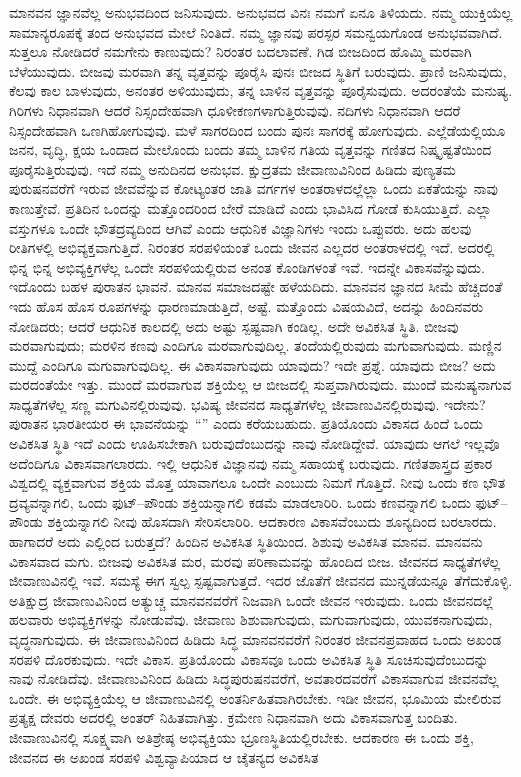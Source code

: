 ಮಾನವನ ಜ್ಞಾನವೆಲ್ಲ ಅನುಭವದಿಂದ ಜನಿಸುವುದು. ಅನುಭವದ ವಿನಃ ನಮಗೆ ಏನೂ ತಿಳಿಯದು. ನಮ್ಮ ಯುಕ್ತಿಯೆಲ್ಲ ಸಾಮಾನ್ಯರೂಪಕ್ಕೆ ತಂದ ಅನುಭವದ ಮೇಲೆ ನಿಂತಿದೆ. ನಮ್ಮ ಜ್ಞಾನವು ಪರಸ್ಪರ ಸಮನ್ವಯಗೊಂಡ ಅನುಭವವಾಗಿದೆ. ಸುತ್ತಲೂ ನೋಡಿದರೆ ನಮಗೇನು ಕಾಣುವುದು? ನಿರಂತರ ಬದಲಾವಣೆ. ಗಿಡ ಬೀಜದಿಂದ ಹೊಮ್ಮಿ ಮರವಾಗಿ ಬೆಳೆಯುವುದು. ಬೀಜವು ಮರವಾಗಿ ತನ್ನ ವೃತ್ತವನ್ನು ಪೂರೈಸಿ ಪುನಃ ಬೀಜದ ಸ್ಥಿತಿಗೆ ಬರುವುದು. ಪ್ರಾಣಿ ಜನಿಸುವುದು, ಕೆಲವು ಕಾಲ ಬಾಳುವುದು, ಅನಂತರ ಅಳಿಯುವುದು, ತನ್ನ ಬಾಳಿನ ವೃತ್ತವನ್ನು ಪೂರೈಸುವುದು. ಅದರಂತೆಯೆ ಮನುಷ್ಯ. ಗಿರಿಗಳು ನಿಧಾನವಾಗಿ ಆದರೆ ನಿಸ್ಸಂದೇಹವಾಗಿ ಧೂಳೀಕಣಗಳಾಗುತ್ತಿರುವುವು. ನದಿಗಳು ನಿಧಾನವಾಗಿ ಆದರೆ ನಿಸ್ಸಂದೇಹವಾಗಿ ಒಣಗಿಹೋಗುವುವು. ಮಳೆ ಸಾಗರದಿಂದ ಬಂದು ಪುನಃ ಸಾಗರಕ್ಕೆ ಹೋಗುವುದು. ಎಲ್ಲೆಡೆಯಲ್ಲಿಯೂ ಜನನ, ವೃದ್ಧಿ, ಕ್ಷಯ ಒಂದಾದ ಮೇಲೊಂದು ಬಂದು ತಮ್ಮ ಬಾಳಿನ ಗತಿಯ ವೃತ್ತವನ್ನು ಗಣಿತದ ನಿಷ್ಕೃಷ್ಟತೆಯಿಂದ ಪೂರೈಸುತ್ತಿರುವುವು. ಇದೆ ನಮ್ಮ ಅನುದಿನದ ಅನುಭವ. ಕ್ಷುದ್ರತಮ ಜೀವಾಣುವಿನಿಂದ ಹಿಡಿದು ಪುಣ್ಯತಮ ಪುರುಷನವರೆಗೆ ಇರುವ ಜೀವವೆನ್ನುವ ಕೋಟ್ಯಂತರ ಜಾತಿ ವರ್ಗಗಳ ಅಂತರಾಳದಲ್ಲೆಲ್ಲಾ ಒಂದು ಏಕತೆಯನ್ನು ನಾವು ಕಾಣುತ್ತೇವೆ. ಪ್ರತಿದಿನ ಒಂದನ್ನು ಮತ್ತೊಂದರಿಂದ ಬೇರೆ ಮಾಡಿದೆ ಎಂದು ಭಾವಿಸಿದ ಗೋಡೆ ಕುಸಿಯುತ್ತಿದೆ. ಎಲ್ಲಾ ವಸ್ತುಗಳೂ ಒಂದೇ ಭೌತದ್ರವ್ಯದಿಂದ ಆಗಿವೆ ಎಂದು ಆಧುನಿಕ ವಿಜ್ಞಾನಿಗಳು ಇಂದು ಒಪ್ಪುವರು. ಅದು ಹಲವು ರೀತಿಗಳಲ್ಲಿ ಅಭಿವ್ಯಕ್ತವಾಗುತ್ತಿದೆ. ನಿರಂತರ ಸರಪಳಿಯಂತೆ ಒಂದು ಜೀವನ ಎಲ್ಲದರ ಅಂತರಾಳದಲ್ಲಿ ಇದೆ. ಅದರಲ್ಲಿ ಭಿನ್ನ ಭಿನ್ನ ಅಭಿವ್ಯಕ್ತಿಗಳೆಲ್ಲ ಒಂದೇ ಸರಪಳಿಯಲ್ಲಿರುವ ಅನಂತ ಕೊಂಡಿಗಳಂತೆ ಇವೆ. ಇದನ್ನೇ ವಿಕಾಸವೆನ್ನುವುದು. ಇದೊಂದು ಬಹಳ ಪುರಾತನ ಭಾವನೆ. ಮಾನವ ಸಮಾಜದಷ್ಟೇ ಹಳೆಯದಿದು. ಮಾನವನ ಜ್ಞಾನದ ಸೀಮೆ ಹೆಚ್ಚಿದಂತೆ ಇದು ಹೊಸ ಹೊಸ ರೂಪಗಳನ್ನು ಧಾರಣಮಾಡುತ್ತಿದೆ, ಅಷ್ಟೆ. ಮತ್ತೊಂದು ವಿಷಯವಿದೆ, ಅದನ್ನು ಹಿಂದಿನವರು ನೋಡಿದರು; ಆದರೆ ಆಧುನಿಕ ಕಾಲದಲ್ಲಿ ಅದು ಅಷ್ಟು ಸ್ಪಷ್ಟವಾಗಿ ಕಂಡಿಲ್ಲ. ಅದೇ ಅವಿಕಸಿತ ಸ್ಥಿತಿ. ಬೀಜವು ಮರವಾಗುವುದು; ಮರಳಿನ ಕಣವು ಎಂದಿಗೂ ಮರವಾಗುವುದಿಲ್ಲ. ತಂದೆಯಲ್ಲಿರುವುದು ಮಗುವಾಗುವುದು. ಮಣ್ಣಿನ ಮುದ್ದೆ ಎಂದಿಗೂ ಮಗುವಾಗುವುದಿಲ್ಲ. ಈ ವಿಕಾಸವಾಗುವುದು ಯಾವುದು? ಇದೇ ಪ್ರಶ್ನೆ. ಯಾವುದು ಬೀಜ? ಅದು ಮರದಂತೆಯೇ ಇತ್ತು. ಮುಂದೆ ಮರವಾಗುವ ಶಕ್ತಿಯೆಲ್ಲ ಆ ಬೀಜದಲ್ಲಿ ಸುಪ್ತವಾಗಿರುವುದು. ಮುಂದೆ ಮನುಷ್ಯನಾಗುವ ಸಾಧ್ಯತೆಗಳೆಲ್ಲ ಸಣ್ಣ ಮಗುವಿನಲ್ಲಿರುವುವು. ಭವಿಷ್ಯ ಜೀವನದ ಸಾಧ್ಯತೆಗಳೆಲ್ಲ ಜೀವಾಣುವಿನಲ್ಲಿರುವುವು. ಇದೇನು? ಪುರಾತನ ಭಾರತೀಯರ ಈ ಭಾವನೆಯನ್ನು “” ಎಂದು ಕರೆಯಬಹುದು. ಪ್ರತಿಯೊಂದು ವಿಕಾಸದ ಹಿಂದೆ ಒಂದು ಅವಿಕಸಿತ ಸ್ಥಿತಿ ಇದೆ ಎಂದು ಊಹಿಸಬೇಕಾಗಿ ಬರುವುದೆಂಬುದನ್ನು ನಾವು ನೋಡಿದ್ದೇವೆ. ಯಾವುದು ಆಗಲೆ ಇಲ್ಲವೊ ಅದೆಂದಿಗೂ ವಿಕಾಸವಾಗಲಾರದು. ಇಲ್ಲಿ ಆಧುನಿಕ ವಿಜ್ಞಾನವು ನಮ್ಮ ಸಹಾಯಕ್ಕೆ ಬರುವುದು. ಗಣಿತಶಾಸ್ತ್ರದ ಪ್ರಕಾರ ವಿಶ್ವದಲ್ಲಿ ವ್ಯಕ್ತವಾಗುವ ಶಕ್ತಿಯ ಮೊತ್ತ ಯಾವಾಗಲೂ ಒಂದೇ ಎಂಬುದು ನಿಮಗೆ ಗೊತ್ತಿದೆ. ನೀವು ಒಂದು ಕಣ ಭೌತ ದ್ರವ್ಯವನ್ನಾಗಲಿ, ಒಂದು ಫುಟ್​–ಪೌಂಡು ಶಕ್ತಿಯನ್ನಾಗಲಿ ಕಡಮೆ ಮಾಡಲಾರಿರಿ. ಒಂದು ಕಣವನ್ನಾಗಲಿ ಒಂದು ಫುಟ್​–ಪೌಂಡು ಶಕ್ತಿಯನ್ನಾಗಲಿ ನೀವು ಹೊಸದಾಗಿ ಸೇರಿಸಲಾರಿರಿ. ಆದಕಾರಣ ವಿಕಾಸವೆಂಬುದು ಶೂನ್ಯದಿಂದ ಬರಲಾರದು. ಹಾಗಾದರೆ ಅದು ಎಲ್ಲಿಂದ ಬರುತ್ತದೆ? ಹಿಂದಿನ ಅವಿಕಸಿತ ಸ್ಥಿತಿಯಿಂದ. ಶಿಶುವು ಅವಿಕಸಿತ ಮಾನವ. ಮಾನವನು ವಿಕಾಸವಾದ ಮಗು. ಬೀಜವು ಅವಿಕಸಿತ ಮರ, ಮರವು ಪರಿಣಾಮವನ್ನು ಹೊಂದಿದ ಬೀಜ. ಜೀವನದ ಸಾಧ್ಯತೆಗಳೆಲ್ಲ ಜೀವಾಣುವಿನಲ್ಲಿ ಇವೆ. ಸಮಸ್ಯೆ ಈಗ ಸ್ವಲ್ಪ ಸ್ಪಷ್ಟವಾಗುತ್ತದೆ. ಇದರ ಜೊತೆಗೆ ಜೀವನದ ಮುನ್ನಡೆಯನ್ನೂ ತೆಗೆದುಕೊಳ್ಳಿ. ಅತಿಕ್ಷುದ್ರ ಜೀವಾಣುವಿನಿಂದ ಅತ್ಯುಚ್ಚ ಮಾನವನವರೆಗೆ ನಿಜವಾಗಿ ಒಂದೇ ಜೀವನ ಇರುವುದು. ಒಂದು ಜೀವನದಲ್ಲೆ ಹಲವಾರು ಅಭಿವ್ಯಕ್ತಿಗಳನ್ನು ನೋಡುವೆವು. ಜೀವಾಣು ಶಿಶುವಾಗುವುದು, ಮಗುವಾಗುವುದು, ಯುವಕನಾಗುವುದು, ವೃದ್ಧನಾಗುವುದು. ಈ ಜೀವಾಣುವಿನಿಂದ ಹಿಡಿದು ಸಿದ್ಧ ಮಾನವನವರೆಗೆ ನಿರಂತರ ಜೀವನಪ್ರವಾಹದ ಒಂದು ಅಖಂಡ ಸರಪಳಿ ದೊರಕುವುದು. ಇದೇ ವಿಕಾಸ. ಪ್ರತಿಯೊಂದು ವಿಕಾಸವೂ ಒಂದು ಅವಿಕಸಿತ ಸ್ಥಿತಿ ಸೂಚಿಸುವುದೆಂಬುದನ್ನು ನಾವು ನೋಡಿದೆವು. ಜೀವಾಣುವಿನಿಂದ ಹಿಡಿದು ಸಿದ್ಧಪುರುಷನವರೆಗೆ, ಅವತಾರದವರೆಗೆ ವಿಕಾಸವಾಗುವ ಜೀವನವೆಲ್ಲ ಒಂದೇ. ಈ ಅಭಿವ್ಯಕ್ತಿಯೆಲ್ಲ ಆ ಜೀವಾಣುವಿನಲ್ಲಿ ಅಂತರ್ನಿಹಿತವಾಗಿರಬೇಕು. ಇಡೀ ಜೀವನ, ಭೂಮಿಯ ಮೇಲಿರುವ ಪ್ರತ್ಯಕ್ಷ ದೇವರು ಅದರಲ್ಲಿ ಅಂತರ್ ನಿಹಿತವಾಗಿತ್ತು. ಕ್ರಮೇಣ ನಿಧಾನವಾಗಿ ಅದು ವಿಕಾಸವಾಗುತ್ತ ಬಂದಿತು. ಜೀವಾಣುವಿನಲ್ಲಿ ಸೂಕ್ಷ್ಮವಾಗಿ ಅತಿಶ್ರೇಷ್ಠ ಅಭಿವ್ಯಕ್ತಿಯು ಭ್ರೂಣಸ್ಥಿತಿಯಲ್ಲಿರಬೇಕು. ಆದಕಾರಣ ಈ ಒಂದು ಶಕ್ತಿ, ಜೀವನದ ಈ ಅಖಂಡ ಸರಪಳಿ ವಿಶ್ವವ್ಯಾಪಿಯಾದ ಆ ಚೈತನ್ಯದ ಅವಿಕಸಿತ 